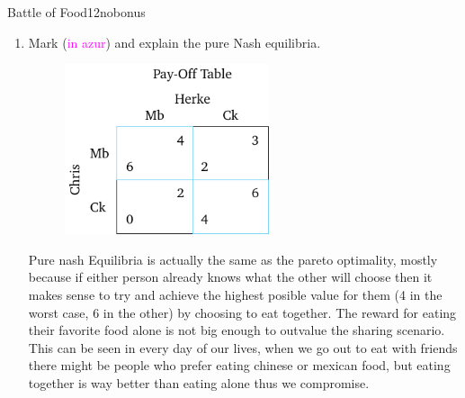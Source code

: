 \documentclass[twoside,english,colorbacktitle,accentcolor=tud9c,10pt]{tudexercise}
\begin{document}
\begin{questions}
\begin{question}{Battle of Food}{12}{nobonus}
\begin{enumerate}
		In this game the pareto optimality lies where both people select the same food.
 		By definition pareto optimality means that we cannot improve on one person without harming the other, and in this case we can see that either of the outcomes where they pick the same food the "social welfare" is ideal. to start with the different choice scenario has lower values for either of them, so there is no point in switching to those lesser values from either person point of view. The other option is to switch from the lesser value(4) to the other maximum (6), but that would require lowering the other persons value, thus breaking the description.
		\item Mark (\textcolor{magenta}{in azur}) and explain the pure Nash equilibria.
		\begin{figure}[H]
		\centering
		\includegraphics[height=5cm]{answerbattleNE.pdf}
		\end{figure}
		Pure nash Equilibria is actually the same as the pareto optimality, mostly because if either person already knows what the other will choose then it makes sense to try and achieve the highest posible value for them (4 in the worst case, 6 in the other) by choosing to eat together. The reward for eating their favorite food alone is not big enough to outvalue the sharing scenario. This can be seen in every day of our lives, when we go out to eat with friends there might be people who prefer eating chinese or mexican food, but eating together is way better than eating alone thus we compromise.



\end{enumerate}
\end{question}
\end{questions}
\end{document}
